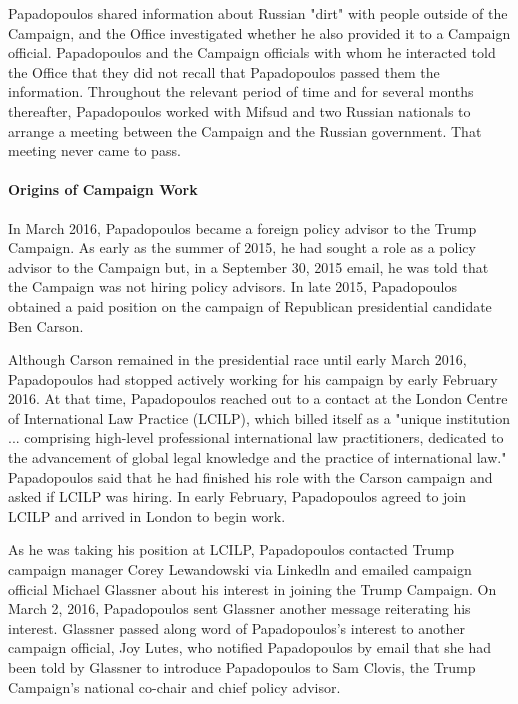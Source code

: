 Papadopoulos shared information about Russian "dirt" with people outside of the Campaign, and the Office investigated whether he also provided it to a Campaign official.
Papadopoulos and the Campaign officials with whom he interacted told the Office that they did not recall that Papadopoulos passed them the information.
Throughout the relevant period of time and for several months thereafter, Papadopoulos worked with Mifsud and two Russian nationals to arrange a meeting between the Campaign and the Russian government.
That meeting never came to pass.

\paragraph{Origins of Campaign Work}

In March 2016, Papadopoulos became a foreign policy advisor to the Trump Campaign.%
As early as the summer of 2015, he had sought a role as a policy advisor to the Campaign but, in a September 30, 2015 email, he was told that the Campaign was not hiring policy advisors.%
In late 2015, Papadopoulos obtained a paid position on the campaign of Republican presidential candidate Ben Carson.%

Although Carson remained in the presidential race until early March 2016, Papadopoulos had stopped actively working for his campaign by early February 2016.%
At that time, Papadopoulos reached out to a contact at the London Centre of International Law Practice (LCILP), which billed itself as a "unique institution ... comprising high-level professional international law practitioners, dedicated to the advancement of global legal knowledge and the practice of international law."%
Papadopoulos said that he had finished his role with the Carson campaign and asked if LCILP was hiring.%
In early February, Papadopoulos agreed to join LCILP and arrived in London to begin work.%

As he was taking his position at LCILP, Papadopoulos contacted Trump campaign manager Corey Lewandowski via Linkedln and emailed campaign official Michael Glassner about his interest in joining the Trump Campaign.%
On March 2, 2016, Papadopoulos sent Glassner another message reiterating his interest.%
Glassner passed along word of Papadopoulos's interest to another campaign official, Joy Lutes, who notified Papadopoulos by email that she had been told by Glassner to introduce Papadopoulos to Sam Clovis, the Trump Campaign's national co-chair and chief policy advisor.%

